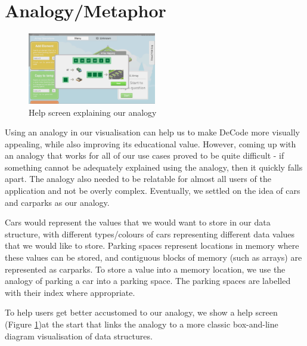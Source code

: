 \documentclass[11pt]{article}
\begin{document}
\section{Analogy/Metaphor}
\begin{figure}
  \centering
  \includegraphics[width=0.5\textwidth]{images/helpanalogy.png}
\caption{Help screen explaining our analogy}
\label{fig:helpanalogy}
\end{figure}
Using an analogy in our visualisation can help us to make DeCode more visually appealing, while also improving its educational value\cite{Park}\cite{vegh2}. However, coming up with an analogy that works for all of our use cases proved to be quite difficult - if something cannot be adequately explained using the analogy, then it quickly falls apart. The analogy also needed to be relatable for almost all users of the application and not be overly complex. Eventually, we settled on the idea of cars and carparks as our analogy.\par
Cars would represent the values that we would want to store in our data structure, with different types/colours of cars representing different data values that we would like to store. Parking spaces represent locations in memory where these values can be stored, and contiguous blocks of memory (such as arrays) are represented as carparks. To store a value into a memory location, we use the analogy of parking a car into a parking space. The parking spaces are labelled with their index where appropriate.\par
To help users get better accustomed to our analogy, we show a help screen (Figure \ref{fig:helpanalogy})at the start that links the analogy to a more classic box-and-line diagram visualisation of data structures.
\end{document}
